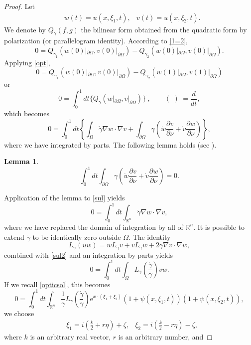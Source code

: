 \documentclass[10pt, a4paper, twoside, openright]{book}
\theoremstyle{definition}
\theoremstyle{plain}
\theoremstyle{plain}
\theoremstyle{plain}
\theoremstyle{plain}
\theoremstyle{plain}
\newtheorem{lemma}[subsection]{Lemma}
\theoremstyle{plain}
\theoremstyle{plain}
\theoremstyle{plain}
\begin{document}
\begin{proof}
Let
\begin{align*}
&w(t)=u(x,\xi_1,t),&v(t)=u(x,\xi_2,t).
\end{align*}
We denote by $Q_{\gamma}(f,g)$ the bilinear form obtained from the quadratic
form by polarization (or parallelogram identity). According to \eqref{1=2},
$$0=Q_{\gamma_1}(w(0)|_{\partial\Omega},v(0)|_{\partial\Omega})-
Q_{\gamma_2}(w(0)|_{\partial\Omega},v(0)|_{\partial\Omega}).$$
Applying \eqref{opt},
$$0=Q_{\gamma_1}(w(0)|_{\partial\Omega},v(0)|_{\partial\Omega})-
Q_{\gamma_2}(w(1)|_{\partial\Omega},v(1)|_{\partial\Omega})$$
or
$$0=\int_0^1dt\{Q_{\gamma}(w|_{\partial\Omega},v|_{\partial\Omega})\}^{\bm\cdot},
\qquad(\,\,)^{\bm\cdot}=\frac{d}{dt},$$
which becomes
\begin{equation}
\label{sul}
0=\int_0^1dt\left\{\int_{\Omega}\dot{\gamma}\nabla w\cdot\nabla v
+\int_{\partial\Omega}\gamma\left(\dot{w}\frac{\partial v}{\partial\nu}+
\dot{v}\frac{\partial w}{\partial\nu}\right)\right\},
\end{equation}
where we have integrated by parts.
The following lemma holds (see \cite[Lemma 2.8]{Sy-Uh}).
\begin{lemma}
\label{lemmasu}
$$\int_0^1dt\int_{\partial\Omega}\gamma\left(\dot{w}\frac{\partial v}{\partial\nu}+
\dot{v}\frac{\partial w}{\partial\nu}\right)=0.$$
\end{lemma}
Application of the lemma to \eqref{sul} yields
\begin{equation}
\label{sul2}
0=\int_0^1dt\int_{\mathbb{R}^n}\dot{\gamma}\nabla w\cdot\nabla v,
\end{equation}
where we have replaced the domain of integration by all of $\mathbb{R}^n$.
It is possible to extend $\dot{\gamma}$ to be identically zero outside
$\Omega$. The identity
$$L_{\gamma}(uw)=wL_{\gamma}v+vL_{\gamma}w
+2\gamma\nabla v\cdot\nabla w,$$
combined with \eqref{sul2} and an integration by parts yields
$$0=\int_0^1dt\int_{\Omega}L_{\gamma}\left(
\frac{\dot{\gamma}}{\gamma}\right)vw.$$
If we recall \eqref{opticsol}, this becomes
\begin{equation}
\label{sul3}
0=\int_0^1dt\int_{\mathbb{R}^n}\frac{1}{\gamma}
L_{\gamma}\left(\frac{\dot{\gamma}}{\gamma}\right)
\mathrm{e}^{x\cdot(\xi_1+\xi_2)}(1+\psi(x,\xi_1,t))
(1+\psi(x,\xi_2,t)),
\end{equation}
we choose
\begin{align*}
&\xi_1=i\left(\frac{k}{2}+r\eta\right)+\zeta,
&\xi_2=i\left(\frac{k}{2}-r\eta\right)-\zeta,
\end{align*}
where $k$ is an arbitrary real vector, $r$ is an arbitrary number, and

\end{proof}
\end{document}
